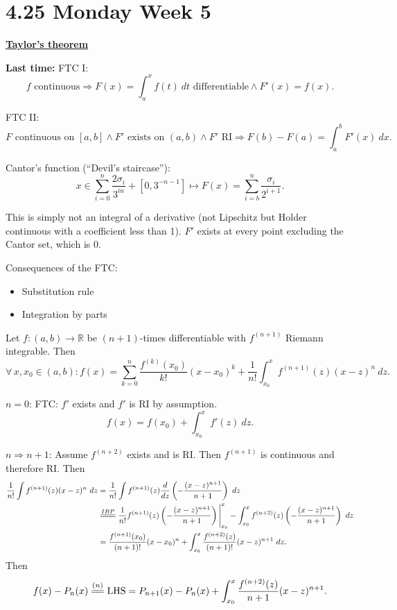 \documentclass{notes}
\begin{document}
  \newpage
  
  \section{4.25 Monday Week 5}
  
  {\boldmath \bfseries \underline{Taylor's theorem}}

  {\boldmath \bfseries Last time:} FTC I: 
  \[
    \text{$f$ continuous} \Rightarrow F(x) = \int_a^x f(t)\ dt \text{ differentiable} \land F'(x) = f(x).
  \]
  
  FTC II: 
  \[
    \text{$F$ continuous on $[a, b]$} \land \text{$F'$ exists on $(a, b)$} \land \text{$F'$ RI} \Rightarrow F(b) - F(a) = \int_a^b  F'(x)\ dx.
  \]
  
  Cantor's function (``Devil's staircase''): 
  \[
    x \in \sum_{i = 0}^n \frac{2 \sigma_i}{3^{i n}} + [0, 3^{-n - 1}] \mapsto F(x) = \sum_{i = b}^n \frac{\sigma_i}{2^{i + 1}}.
  \]
  
  This is simply not an integral of a derivative (not Lipschitz but Holder continuous with a coefficient less than 1).
  $F'$ exists at every point excluding the Cantor set, which is 0.
  
  Consequences of the FTC: 
  \begin{itemize}
    \item Substitution rule

    \item Integration by parts
  \end{itemize}
  
  \begin{thm}
    Let $f \colon (a, b) \to \mathbb R$ be $(n + 1)$-times differentiable with $f^{(n + 1)}$ Riemann integrable.
    Then 
    \[
      \forall \, x, x_0 \in (a, b) \colon f(x) = \sum_{k = 0}^n \frac{f^{(k)}(x_0)}{k!} (x - x_0)^k + \frac{1}{n!} \int_{x_0}^x f^{(n + 1)}(z) (x - z)^n\ dz.
    \]
  \end{thm}
  
  \begin{prf}
    $n = 0$: FTC: $f'$ exists and $f'$ is RI by assumption.
    \[
      f(x) = f(x_0) + \int_{x_0}^x f'(z)\ dz.
    \]
    
    $n \Rightarrow n + 1$: Assume $f^{(n + 2)}$ exists and is RI.
    Then $f^{(n + 1)}$ is continuous and therefore RI.
    Then 
    \begin{align*}
      \frac{1}{n!} \int f^{(n + 1)}(z) (x - z)^n\ dz &= \frac{1}{n!} \int f^{(n + 1)}(z) \frac{d}{dz} \left ( -\frac{(x - z)^{n + 1}}{n + 1} \right )\ dz \\ 
      &\overset{IBP}{=\joinrel=\joinrel=} \frac{1}{n!} f^{(n + 1)}(z) \left ( -\frac{(x - z)^{n + 1}}{n + 1} \right ) \Bigg |_{x_0}^x - \int_{x_0}^x f^{(n + 2)}(z) \left ( -\frac{(x - z)^{n + 1}}{n + 1} \right )\ dz \\ 
      &= \frac{f^{(n + 1)}(x_0)}{(n + 1)!} (x - x_0)^n + \int_{x_0}^x \frac{f^{(n + 2)}(z)}{(n + 1)!} (x - z)^{n + 1}\ dz.
    \end{align*}
    Then 
    \[
      f(x) - P_n(x) \overset{(n)}{=\joinrel=} \text{LHS} = P_{n + 1}(x) - P_n(x) + \int_{x_0}^x \frac{f^{(n + 2)}(z)}{n + 1} (x - z)^{n + 1}.
    \]
  \end{prf}
  
\end{document}
